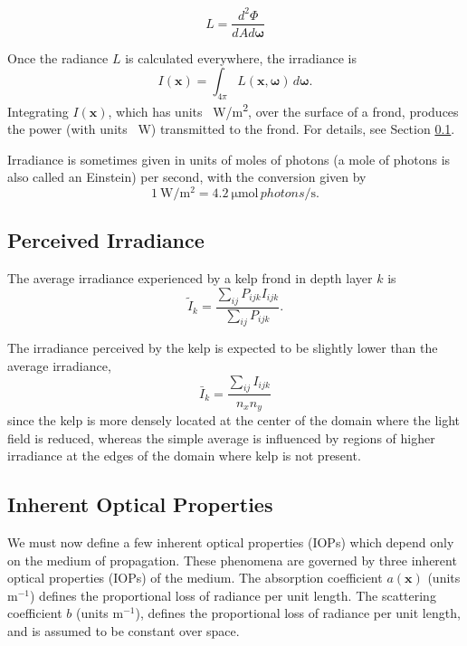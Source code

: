 \documentclass[ms,cpyr,lof,lot]{uathesis}
\renewcommand\vec\bm
\begin{document}
\begin{equation*}
	L = \frac{d^2\Phi}{dA d\vec{\omega}}
\end{equation*}

Once the radiance $L$ is calculated everywhere, the irradiance is
\begin{equation*}
  I(\vec{x}) = \int_{4\pi}L(\vec{x},\vec{\omega})\, d\vec{\omega}.
\end{equation*}
Integrating $I(\vec{x})$, which has units \SI{}{\W/m^2}, over the surface of a frond, produces the power (with units \SI{}{\W}) transmitted to the frond.
For details, see Section \ref{sec:perceived_irrad}.

Irradiance is sometimes given in units of moles of photons (a mole of photons is also called an Einstein) per second, with the conversion \cite{mobley_light_1994} given by
\begin{equation}
  \SI{1}{\W\per\m^2} = \SI{4.2}{\micro\mole \,photons\per\second}.
  \label{eqn:watts_photons}
\end{equation}

\subsection{Perceived Irradiance}
\label{sec:perceived_irrad}

The average irradiance experienced by a kelp frond in depth layer $k$ is
\newcommand{\Iperk}{\tilde{I}_k}
\begin{equation*}
   \Iperk = \frac{\sum_{ij}P_{ijk}I_{ijk}}{\sum_{ij}P_{ijk}}.
\end{equation*}

The irradiance perceived by the kelp is expected to be slightly lower than the average irradiance,
\begin{equation*}
  \bar{I}_k = \frac{\sum_{ij}I_{ijk}}{n_x n_y}
\end{equation*}
since the kelp is more densely located at the center of the domain where the light field is reduced,
whereas the simple average is influenced by regions of higher irradiance at the edges of the domain where kelp is not present.

\subsection{Inherent Optical Properties}
We must now define a few inherent optical properties (IOPs) which depend only on the medium of propagation.
These phenomena are governed by three inherent optical properties (IOPs) of the
medium.
The absorption coefficient $a(\vec{x})$ (units m$^{-1}$) defines the
proportional loss of radiance per unit length.
The scattering coefficient $b$ (units m$^{-1}$), defines the proportional loss
of radiance per unit length, and is assumed to be constant over space.
\end{document}
